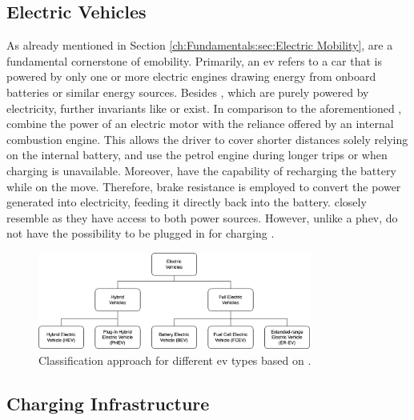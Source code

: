 \subsection{Electric Vehicles}
\label{ch:Fundamentals:sec:Electric Mobility:Electric Vehicles}

As already mentioned in Section \ref{ch:Fundamentals:sec:Electric Mobility},  are a fundamental cornerstone of \acrshort{emobility}. Primarily, an \acrshort{ev} refers to a car that is powered by only one or more electric engines drawing energy from onboard batteries or similar energy sources. 
Besides , which are purely powered by electricity, further invariants like  or  exist. In comparison to the aforementioned ,  combine the power of an electric motor with the reliance offered by an internal combustion engine.
This allows the driver to cover shorter distances solely relying on the internal battery, and use the petrol engine during longer trips or when charging is unavailable. Moreover,  have the capability of recharging the battery while on the move.
Therefore, brake resistance is employed to convert the power generated into electricity, feeding it directly back into the battery.
 closely resemble  as they have access to both power sources. However, unlike a \acrshort{phev},  do not have the possibility to be plugged in for charging \cite{kathiresh_e-mobility_2022}.

\begin{figure}[h]
    \centering
    \includegraphics[width=0.8\textwidth]{resources/images/main/1_fundamentals/ElectricVehicleTypes.png}
    \caption{Classification approach for different \acrshort{ev} types based on \cite{acharige_review_2023}.}
    \label{fig:ev-classification}
\end{figure}

\subsection{Charging Infrastructure}
\label{ch:Fundamentals:sec:Electric Mobility:ssec:Charging Infrastructure}

